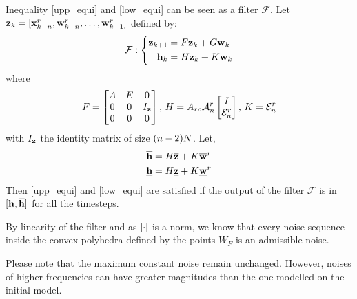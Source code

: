\newcommand{\filter}{\mathcal{F}}
Inequality \ref{upp_equi} and \ref{low_equi} can be seen as a filter $\filter$. Let $ \mathbf{z}_k=[ \mathbf{x}^r_{k-n}, \mathbf{w}^r_{k-n},\dots, \mathbf{w}^r_{k-1}]$  defined by:
\begin{equation}
\filter:
\left\{
\begin{split}
\zkn &= F \zk + G \wk \\
\hk &= H \zk + K \wk \\
\end{split}
\right.
\end{equation}
where
\begin{equation}
F = \begin{bmatrix}
A & E & 0\\
0 & 0 & I_{ \mathbf{z}}\\
0 & 0 & 0 \\
\end{bmatrix}
\textrm{, }
H = 
A_{ro} \mathcal{A}^r_n
\begin{bmatrix}
I \\
\mathcal{E}^r_n
\end{bmatrix}
\textrm{, }
K = \mathcal{E}^r_n
\end{equation}
with $I_{ \mathbf{z}}$ the  identity matrix of size $(n-2)N$.
Let,
\begin{align*}
\overline{ \mathbf{h}} &= H \overline{ \mathbf{z}} + K \overline{ \mathbf{w}}^r\\
\underline{ \mathbf{h}} &= H \underline{ \mathbf{z}} + K \underline{ \mathbf{w}}^r
\end{align*}
Then \ref{upp_equi} and \ref{low_equi} are satisfied if the output of the filter $\filter$ is in $[\underline{ \mathbf{h}},\overline{ \mathbf{h}}]$ for all the timesteps.

By linearity of the filter and as $\left|\cdot\right|$ is a norm, we know that every noise sequence inside the convex polyhedra defined by the points $W_F$ is an admissible noise.

Please note that the maximum constant noise remain unchanged. However, noises of higher frequencies can have greater magnitudes than the one modelled on the initial model. 

